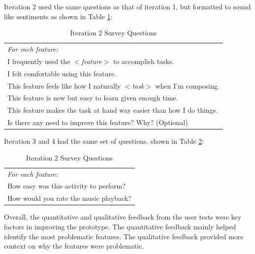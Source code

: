 		
		Iteration 2 used the same questions as that of iteration 1, but formatted to sound like sentiments as shown in Table \ref{tab:it2-survey}: 
		\begin{longtable}{|p{14cm}|}
			\caption{Iteration 2 Survey Questions} \label{tab:it2-survey} \\ 
		  	\hline
		  	\textit{For each feature:} \\ 
		  	\hspace{6mm}I frequently used the \textit{$<$feature$>$} to accomplish tasks. \\
			\hspace{6mm}I felt comfortable using this feature. \\
			\hspace{6mm}This feature feels like how I naturally \textit{$<$task$>$} when I’m composing. \\
			\hspace{6mm}This feature is new but easy to learn given enough time. \\
			\hspace{6mm}This feature makes the task at hand way easier than how I do things. \\
			\hspace{6mm}Is there any need to improve this feature? Why? (Optional) \\
		  	\hline
		\end{longtable}

		Iteration 3 and 4 had the same set of questions, shown in Table \ref{tab:it34-survey}: 
		\begin{longtable}{|p{14cm}|}
			\caption{Iteration 2 Survey Questions} \label{tab:it34-survey} \\ 
		  	\hline
		  	\textit{For each feature:} \\ 
		  	\hspace{6mm}How easy was this activity to perform? \\

		  	How would you rate the music playback? \\
		  	\hline
		\end{longtable}

		Overall, the quantitative and qualitative feedback from the user tests were key factors in improving the prototype. The quantitative feedback mainly helped identify the most problematic features. The qualitative feedback provided more context on why the features were problematic.


